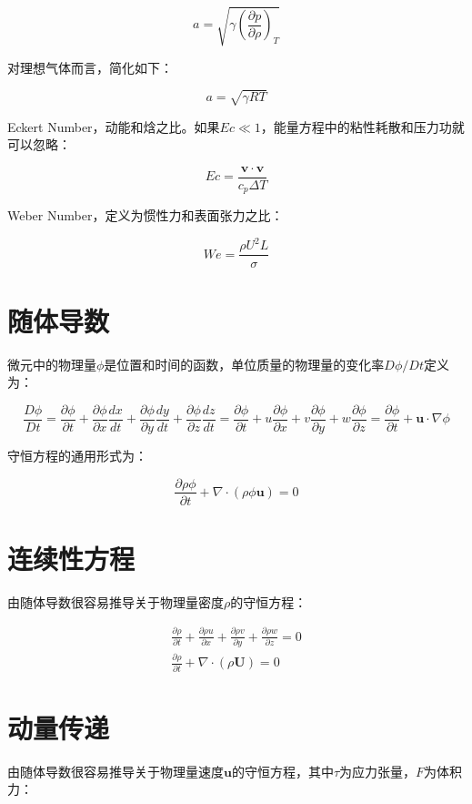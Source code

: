 \[a=\sqrt{\gamma\left( \frac{\partial p}{\partial \rho} \right)_T}\]

对理想气体而言，简化如下：

\[a=\sqrt{\gamma RT}\]

Eckert Number，动能和焓之比。如果$ Ec\ll 1 $，能量方程中的粘性耗散和压力功就可以忽略：

\[Ec=\frac{\mathbf{v\cdot v}}{c_p\Delta T}\]

Weber Number，定义为惯性力和表面张力之比：

\[We=\frac{\rho U^2 L}{\sigma}\]

\section{随体导数}
微元中的物理量$ \phi $是位置和时间的函数，单位质量的物理量的变化率$ D\phi/Dt $定义为：

\begin{equation}
\frac{D\phi}{Dt} = \frac{\partial \phi}{\partial t}+\frac{\partial \phi}{\partial x}\frac{dx}{dt} + \frac{\partial \phi}{\partial y}\frac{dy}{dt} + \frac{\partial \phi}{\partial z}\frac{dz}{dt}=\frac{\partial \phi}{\partial t}+u\frac{\partial \phi}{\partial x}+v\frac{\partial \phi}{\partial y}+w\frac{\partial \phi}{\partial z}=\frac{\partial \phi}{\partial t}+\bm{u}\cdot \nabla \phi
\end{equation}

守恒方程的通用形式为：

\begin{equation}
\frac{\partial \rho\phi}{\partial t}+\nabla\cdot(\rho\phi\bm{u}) = 0
\end{equation}

\section{连续性方程}
由随体导数很容易推导关于物理量密度$ \rho $的守恒方程：

\begin{gather}
\frac{\partial \rho}{\partial t} + \frac{\partial \rho u}{\partial x} + \frac{\partial \rho v}{\partial y} + \frac{\partial \rho w}{\partial z} = 0 \\
\frac{\partial \rho}{\partial t} + \nabla \cdot (\rho\mathbf{U}) = 0
\end{gather}

\section{动量传递}
由随体导数很容易推导关于物理量速度$ \bm{u} $的守恒方程，其中$ \tau $为应力张量，$ F $为体积力：

